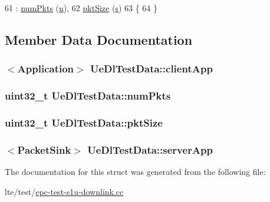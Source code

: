 \begin{DoxyCode}
61   : \hyperlink{structUeDlTestData_aab837629ecc917a6291e5076a9bf3a70}{numPkts} (\hyperlink{namespacesample-rng-plot_aeb5ee5c431e338ef39b7ac5431242e1d}{n}),
62     \hyperlink{structUeDlTestData_a8326ef58fe4d73ce5d4d8d3e72b155f1}{pktSize} (\hyperlink{generate__test__data__lte__sinr_8m_ad83eeb3a142285d1243a08c6b7026df8}{s})
63 \{
64 \}
\end{DoxyCode}


\subsection{Member Data Documentation}
\subsubsection[{\texorpdfstring{client\+App}{clientApp}}]{$<${\bf Application}$>$ Ue\+Dl\+Test\+Data\+::client\+App}\hypertarget{structUeDlTestData_ad6b2c088d49abb61294ef74466b02d7f}{}\label{structUeDlTestData_ad6b2c088d49abb61294ef74466b02d7f}
\subsubsection[{\texorpdfstring{num\+Pkts}{numPkts}}]{\setlength{\rightskip}{0pt plus 5cm}uint32\+\_\+t Ue\+Dl\+Test\+Data\+::num\+Pkts}\hypertarget{structUeDlTestData_aab837629ecc917a6291e5076a9bf3a70}{}\label{structUeDlTestData_aab837629ecc917a6291e5076a9bf3a70}
\subsubsection[{\texorpdfstring{pkt\+Size}{pktSize}}]{\setlength{\rightskip}{0pt plus 5cm}uint32\+\_\+t Ue\+Dl\+Test\+Data\+::pkt\+Size}\hypertarget{structUeDlTestData_a8326ef58fe4d73ce5d4d8d3e72b155f1}{}\label{structUeDlTestData_a8326ef58fe4d73ce5d4d8d3e72b155f1}
\subsubsection[{\texorpdfstring{server\+App}{serverApp}}]{$<${\bf Packet\+Sink}$>$ Ue\+Dl\+Test\+Data\+::server\+App}\hypertarget{structUeDlTestData_af1e1349aa942270c2fd37dc6d5b00f0d}{}\label{structUeDlTestData_af1e1349aa942270c2fd37dc6d5b00f0d}


The documentation for this struct was generated from the following file\+:\begin{DoxyCompactItemize}
\item 
lte/test/\hyperlink{epc-test-s1u-downlink_8cc}{epc-\/test-\/s1u-\/downlink.\+cc}\end{DoxyCompactItemize}
